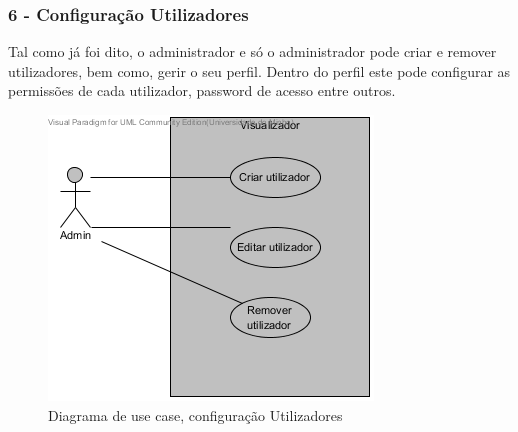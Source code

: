 \subsubsection{\textbf{6 - Configuração Utilizadores}}

Tal como já foi dito, o administrador e só o administrador pode criar e remover utilizadores, bem como, gerir o seu perfil. Dentro do perfil este
pode configurar as permissões de cada utilizador, password de acesso entre outros.

\begin{figure}[!htb]
	\centering
	\includegraphics[scale=0.80]{images/ucs/ConfUtilizadores}
	\caption {Diagrama de use case, configuração Utilizadores}
\end{figure}
\pagebreak


